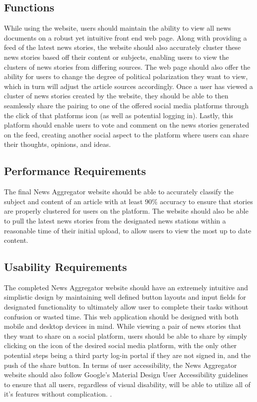 \documentclass[onecolumn, draftclsnofoot,10pt, compsoc]{IEEEtran}
\begin{document}
\subsection{Functions}
While using the website, users should maintain the ability to view all news documents on a robust yet intuitive front end web page. Along with providing a feed of the latest news stories, the website should also accurately cluster these news stories based off their content or subjects, enabling users to view the clusters of news stories from differing sources. The web page should also offer the ability for users to change the degree of political polarization they want to view, which in turn will adjust the article sources accordingly. Once a user has viewed a cluster of news stories created by the website, they should be able to then seamlessly share the pairing to one of the offered social media platforms through the click of that platforms icon (as well as potential logging in). Lastly, this platform should enable users to vote and comment on the news stories generated on the feed, creating another social aspect to the platform where users can share their thoughts, opinions, and ideas.
\subsection{Performance Requirements}
The final News Aggregator website should be able to accurately classify the subject and content of an article with at least 90\% accuracy to ensure that stories are properly clustered for users on the platform. The website should also be able to pull the latest news stories from the designated news stations within a reasonable time of their initial upload, to allow users to view the most up to date content.
\subsection{Usability Requirements}
The completed News Aggregator website should have an extremely intuitive and simplistic design by maintaining well defined button layouts and input fields for designated functionality to ultimately allow user to complete their tasks without confusion or wasted time. This web application should be designed with both mobile and desktop devices in mind. While viewing a pair of news stories that they want to share on a social platform, users should be able to share by simply clicking on the icon of the desired social media platform, with the only other potential steps being a third party log-in portal if they are not signed in, and the push of the share button. In terms of user accessibility, the News Aggregator website should also follow Google’s Material Design User Accessibility guidelines to ensure that all users, regardless of visual disability, will be able to utilize all of it's features without complication. \cite{accessibility_guidelines}.
\end{document}

